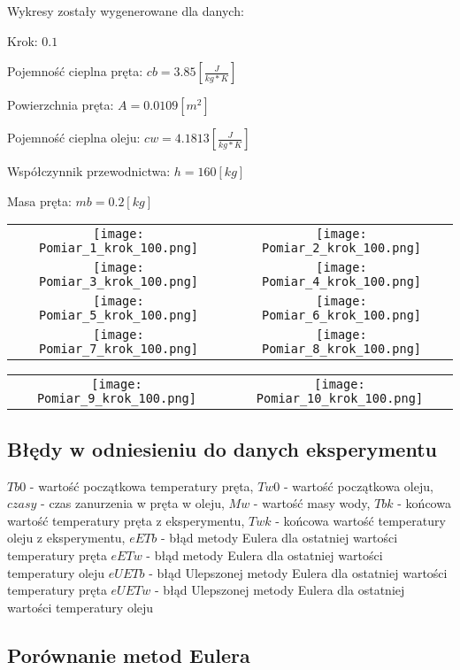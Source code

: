 \documentclass[varwidth,12pt,a4paper]{article}
\begin{document}
Wykresy zostały wygenerowane dla danych:

Krok: $0.1$

Pojemność cieplna pręta: $cb=3.85[\frac{J}{kg * K}]$ 

Powierzchnia pręta: $A=0.0109[m^2]$

Pojemność cieplna oleju: $cw=4.1813[\frac{J}{kg * K}]$

Współczynnik przewodnictwa: $h=160[kg]$

Masa pręta: $mb=0.2[kg]$

\begin{tabular}{cc}
    \texttt{[image: Pomiar\_1\_krok\_100.png]} &
    \texttt{[image: Pomiar\_2\_krok\_100.png]} \\
    \texttt{[image: Pomiar\_3\_krok\_100.png]} &
    \texttt{[image: Pomiar\_4\_krok\_100.png]} \\
    \texttt{[image: Pomiar\_5\_krok\_100.png]} &
    \texttt{[image: Pomiar\_6\_krok\_100.png]} \\
    \texttt{[image: Pomiar\_7\_krok\_100.png]} &
    \texttt{[image: Pomiar\_8\_krok\_100.png]} 
\end{tabular}

\begin{tabular}{cc}
    \texttt{[image: Pomiar\_9\_krok\_100.png]} &
    \texttt{[image: Pomiar\_10\_krok\_100.png]} 
\end{tabular}

\subsection{Błędy w odniesieniu do danych eksperymentu}

$Tb0$ - wartość początkowa temperatury pręta,
$Tw0$ - wartość początkowa oleju,
$czasy$ - czas zanurzenia w pręta w oleju,
$Mw$ - wartość masy wody,
$Tbk$ - końcowa wartość temperatury pręta z eksperymentu,
$Twk$ - końcowa wartość temperatury oleju z eksperymentu,
$eETb$ - błąd metody Eulera dla ostatniej wartości temperatury pręta
$eETw$ - błąd metody Eulera dla ostatniej wartości temperatury oleju
$eUETb$ - błąd Ulepszonej metody Eulera dla ostatniej wartości temperatury pręta
$eUETw$ - błąd Ulepszonej metody Eulera dla ostatniej wartości temperatury oleju

\subsection{Porównanie metod Eulera}
\end{document}
